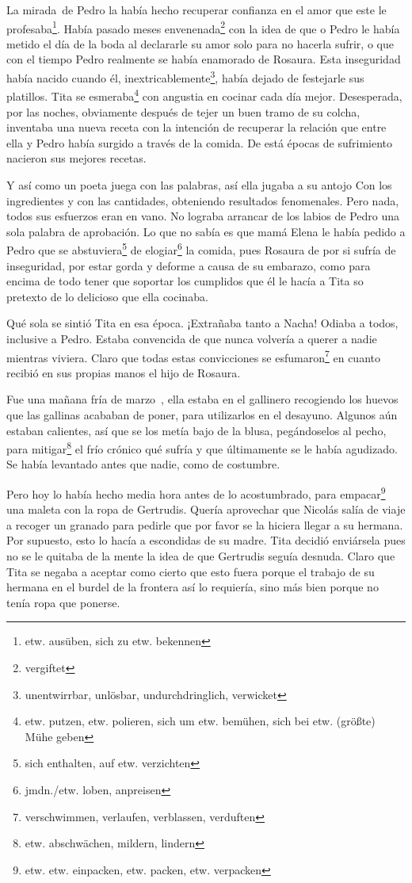 La mirada~de Pedro la había hecho recuperar confianza en el amor
que este le profesaba\footnote{etw. ausüben, sich zu etw. bekennen}.
Había pasado meses envenenada\footnote{vergiftet} con la
idea de que o Pedro le había metido el día de la boda al declararle
su amor solo para no hacerla sufrir, o que con el tiempo Pedro realmente
se había enamorado de Rosaura. Esta inseguridad había nacido cuando él, inextricablemente\footnote{unentwirrbar, unlösbar, undurchdringlich, verwicket},
había dejado de festejarle sus platillos. Tita se esmeraba\footnote{etw. putzen, etw. polieren, sich um etw. bemühen, sich bei etw. (größte) Mühe geben}
con angustia en cocinar cada día mejor. Desesperada, por las
noches, obviamente después de tejer un buen tramo de su colcha,
inventaba una nueva receta con la intención de recuperar la relación que
entre ella y Pedro había surgido a través de la comida. De está épocas
de sufrimiento nacieron sus mejores recetas.

Y así como un poeta juega con las palabras, así ella jugaba a su antojo
Con los ingredientes y con las cantidades, obteniendo resultados
fenomenales. Pero nada, todos sus esfuerzos eran en vano. No lograba
arrancar de los labios de Pedro una sola palabra de aprobación. Lo que
no sabía es que mamá Elena le había \glqq{}pedido\grqq{} a Pedro que se abstuviera\footnote{sich enthalten, auf etw. verzichten}
de elogiar\footnote{jmdn./etw. loben, anpreisen} la
comida, pues Rosaura de por si sufría de inseguridad, por
estar gorda y deforme a causa de su embarazo, como para encima de todo
tener que soportar los cumplidos que él le hacía a Tita so pretexto de
lo delicioso que ella cocinaba.

Qué sola se sintió Tita en esa época. ¡Extrañaba tanto a Nacha! Odiaba a
todos, inclusive a Pedro. Estaba convencida de que nunca volvería a
querer a nadie mientras viviera. Claro que todas estas convicciones se esfumaron\footnote{verschwimmen, verlaufen, verblassen, verduften}
en cuanto recibió en sus propias manos el hijo de Rosaura.

Fue una mañana fría de marzo~, ella estaba en el gallinero
recogiendo los huevos que las gallinas acababan de poner, para
utilizarlos en el desayuno. Algunos aún estaban calientes, así que se
los metía bajo de la blusa, pegándoselos al pecho, para mitigar\footnote{etw. abschwächen, mildern, lindern}
el frío crónico qué sufría y que últimamente se le había agudizado.
Se había levantado antes que nadie, como de costumbre.

Pero hoy lo había hecho media hora antes de lo acostumbrado, para empacar\footnote{etw. etw. einpacken, etw. packen, etw. verpacken}
una maleta con la ropa de Gertrudis. Quería aprovechar que
Nicolás salía de viaje a recoger un granado para pedirle que por favor
se la hiciera llegar a su hermana. Por supuesto, esto lo hacía a
escondidas de su madre. Tita decidió enviársela pues no se le quitaba de
la mente la idea de que Gertrudis seguía desnuda. Claro que Tita se
negaba a aceptar como cierto que esto fuera porque el trabajo de su
hermana en el burdel de la frontera así lo requiería, sino más bien
porque no tenía ropa que ponerse.

